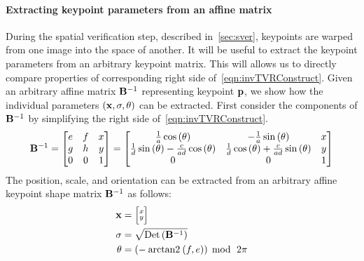         \paragraph{Extracting keypoint parameters from an affine matrix}
        During the spatial verification step, described
          in~\cref{sec:sver}, keypoints are warped from one image into
          the space of another.
        It will be useful to extract the keypoint parameters from an
          arbitrary keypoint matrix.
        This will allows us to directly compare properties of
          corresponding right side of~\cref{eqn:invTVRConstruct}.
        Given an arbitrary affine matrix $\mathbf{B}^{-1}$ representing
          keypoint $\mathbf{p}$, we show how the individual parameters $(\mathbf{x},
          \sigma, \theta)$ can be extracted.
        First consider the components of $\mathbf{B}^{-1}$ by simplifying
          the right side of~\cref{eqn:invTVRConstruct}.
        \begin{equation}\label{eqn:ArbInvRVTMat}
            \mathbf{B}^{-1} = 
             \left[ \begin{matrix} 
            e & f & x\\
            g & h & y\\
            0 & 0 & 1
             \end{matrix} \right]  = 
             \left[ \begin{matrix} 
            \frac{1}{a} \cos{(\theta )}                                 & -\frac{1}{a} \sin{(\theta )}                                & x\\
            \frac{1}{d} \sin{(\theta )} - \frac{c}{a d} \cos{(\theta )} & \frac{1}{d} \cos{(\theta )} + \frac{c}{a d} \sin{(\theta )} & y\\
            0                                                           & 0                                                           & 1
             \end{matrix} \right] 
        \end{equation}
        The position, scale, and orientation can be extracted from an
          arbitrary affine keypoint shape matrix $\mathbf{B}^{-1}$ as follows:
        \begin{equation}\label{eqn:affinewarp}
            \begin{aligned}
                \mathbf{x}     &=  \Bigl[\negthinspace \begin{smallmatrix} x\\y \end{smallmatrix} \negthinspace \Bigr]  \\
                \sigma  &= \sqrt{\mathbin{\textrm{Det}}\left(\mathbf{B}^{-1}\right)}\\
                \theta    &= \left(-\mathbin{\operatorname{arctan2}}\left(f, e\right)\right)\; \operatorname{mod}{} \;\,2\pi
            \end{aligned}
        \end{equation}
